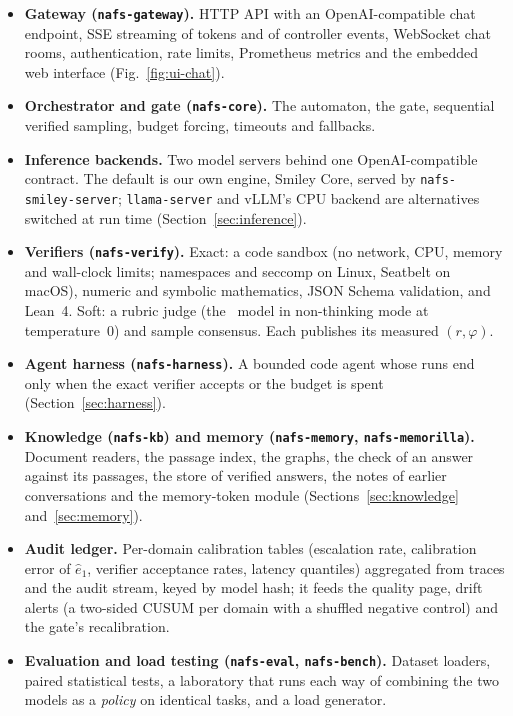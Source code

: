 \begin{itemize}
\item \textbf{Gateway (\texttt{nafs-gateway}).} HTTP API with an
OpenAI-compatible chat endpoint, SSE streaming of tokens and of controller
events, WebSocket chat rooms, authentication, rate limits, Prometheus metrics
and the embedded web interface (Fig.~\ref{fig:ui-chat}).
\item \textbf{Orchestrator and gate (\texttt{nafs-core}).} The automaton, the
gate, sequential verified sampling, budget forcing, timeouts and fallbacks.
\item \textbf{Inference backends.} Two model servers behind one
OpenAI-compatible contract. The default is our own engine, Smiley Core, served
by \texttt{nafs-smiley-server}; \texttt{llama-server} and vLLM's CPU backend
are alternatives switched at run time (Section~\ref{sec:inference}).
\item \textbf{Verifiers (\texttt{nafs-verify}).} Exact: a code sandbox (no
network, CPU, memory and wall-clock limits; namespaces and seccomp on Linux,
Seatbelt on macOS), numeric and symbolic mathematics, JSON Schema validation,
and Lean~4. Soft: a rubric judge (the \Stwo\ model in non-thinking mode at
temperature~0) and sample consensus. Each publishes its measured
$(r,\varphi)$.
\item \textbf{Agent harness (\texttt{nafs-harness}).} A bounded code agent
whose runs end only when the exact verifier accepts or the budget is spent
(Section~\ref{sec:harness}).
\item \textbf{Knowledge (\texttt{nafs-kb}) and memory (\texttt{nafs-memory},
\texttt{nafs-memorilla}).} Document readers, the passage index, the graphs, the
check of an answer against its passages, the store of verified answers, the
notes of earlier conversations and the memory-token module
(Sections~\ref{sec:knowledge} and~\ref{sec:memory}).
\item \textbf{Audit ledger.} Per-domain calibration tables (escalation rate,
calibration error of $\hat e_1$, verifier acceptance rates, latency quantiles)
aggregated from traces and the audit stream, keyed by model hash; it feeds the
quality page, drift alerts (a two-sided CUSUM per domain \cite{page1954cusum}
with a shuffled negative control) and the gate's recalibration.
\item \textbf{Evaluation and load testing (\texttt{nafs-eval},
\texttt{nafs-bench}).} Dataset loaders, paired statistical tests, a laboratory
that runs each way of combining the two models as a \emph{policy} on identical
tasks, and a load generator.
\end{itemize}

